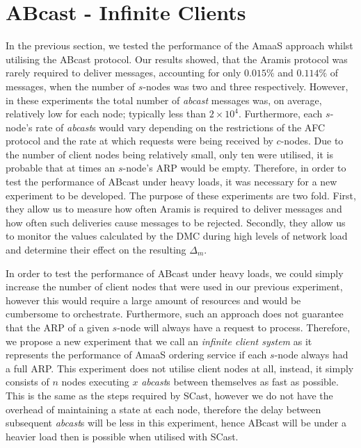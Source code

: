 \section{ABcast - Infinite Clients}\label{sec:infinite_clients_eval}
    In the previous section, we tested the performance of the \textsf{AmaaS} approach whilst utilising the \textsf{ABcast} protocol.  Our results showed, that the \textsf{Aramis} protocol was rarely required to deliver messages, accounting for only $0.015\%$ and $0.114\%$ of messages, when the number of $s$-nodes was two and three respectively.  However, in these experiments the total number of \emph{abcast} messages was, on average, relatively low for each node; typically less than $2 \times 10^4$.  Furthermore, each $s$-node's rate of \emph{abcast}s would vary depending on the restrictions of the AFC protocol and the rate at which requests were being received by $c$-nodes.  Due to the number of client nodes being relatively small, only ten were utilised, it is probable that at times an $s$-node's ARP would be empty.  Therefore, in order to test the performance of \textsf{ABcast} under heavy loads, it was necessary for a new experiment to be developed.  The purpose of these experiments are two fold.  First, they allow us to measure how often \textsf{Aramis} is required to deliver messages and how often such deliveries cause messages to be rejected.  Secondly, they allow us to monitor the values calculated by the DMC during high levels of network load and determine their effect on the resulting $\Delta_m$.  
    
    In order to test the performance of \textsf{ABcast} under heavy loads, we could simply increase the number of client nodes that were used in our previous experiment, however this would require a large amount of resources and would be cumbersome to orchestrate.  Furthermore, such an approach does not guarantee that the ARP of a given $s$-node will always have a request to process.  Therefore, we propose a new experiment that we call an \emph{infinite client system} as it represents the performance of \textsf{AmaaS} ordering service if each $s$-node always had a full ARP.  This experiment does not utilise client nodes at all, instead, it simply consists of $n$ nodes executing $x$ \emph{abcast}s between themselves as fast as possible.  This is the same as the steps required by \textsf{SCast}, however we do not have the overhead of maintaining a state at each node, therefore the delay between subsequent \emph{abcast}s will be less in this experiment, hence \textsf{ABcast} will be under a heavier load then is possible when utilised with \textsf{SCast}. 
    
